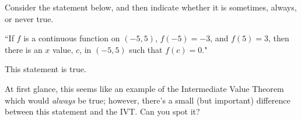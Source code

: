 \documentclass[handout]{ximera}
\begin{document}
\begin{exercise}

Consider the statement below, and then indicate whether it is sometimes, always, or never true.

\begin{center} ``If $f$ is a continuous function on $(-5, 5)$, $f(-5) = -3$, and $f(5) = 3$, then there is an $x$ value, $c$, in $(-5,5)$ such that $f(c) = 0$." \end{center}

This statement is  true.

\begin{feedback}[correct]

At first glance, this seems like an example of the Intermediate Value Theorem which would \textit{always} be true; however, there's a small (but important) difference between this statement and the IVT.  Can you spot it?

\end{feedback}

\end{exercise}
\end{document}
